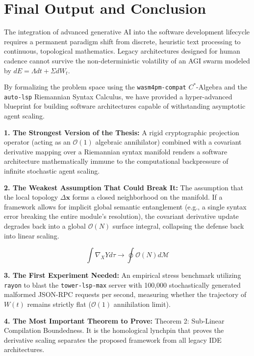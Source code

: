 \section{Final Output and Conclusion}

The integration of advanced generative AI into the software development lifecycle requires a permanent paradigm shift from discrete, heuristic text processing to continuous, topological mathematics. Legacy architectures designed for human cadence cannot survive the non-deterministic volatility of an AGI swarm modeled by $dE = \Lambda dt + \Sigma dW_t$.

By formalizing the problem space using the \texttt{wasm4pm-compat} $C^*$-Algebra and the \texttt{auto-lsp} Riemannian Syntax Calculus, we have provided a hyper-advanced blueprint for building software architectures capable of withstanding asymptotic agent scaling.

\textbf{1. The Strongest Version of the Thesis:}
A rigid cryptographic projection operator (acting as an $\mathcal{O}(1)$ algebraic annihilator) combined with a covariant derivative mapping over a Riemannian syntax manifold renders a software architecture mathematically immune to the computational backpressure of infinite stochastic agent scaling. 

\textbf{2. The Weakest Assumption That Could Break It:}
The assumption that the local topology $\Delta \mathbf{x}$ forms a closed neighborhood on the manifold. If a framework allows for implicit global semantic entanglement (e.g., a single syntax error breaking the entire module's resolution), the covariant derivative update degrades back into a global $\mathcal{O}(N)$ surface integral, collapsing the defense back into linear scaling.

\begin{equation}
\int \nabla_X Y d\tau \to \oint \mathcal{O}(N) d\mathcal{M}
\end{equation}

\textbf{3. The First Experiment Needed:}
An empirical stress benchmark utilizing \texttt{rayon} to blast the \texttt{tower-lsp-max} server with 100,000 stochastically generated malformed JSON-RPC requests per second, measuring whether the trajectory of $W(t)$ remains strictly flat ($\mathcal{O}(1)$ annihilation limit).

\textbf{4. The Most Important Theorem to Prove:}
Theorem 2: Sub-Linear Compilation Boundedness. It is the homological lynchpin that proves the derivative scaling separates the proposed framework from all legacy IDE architectures.

